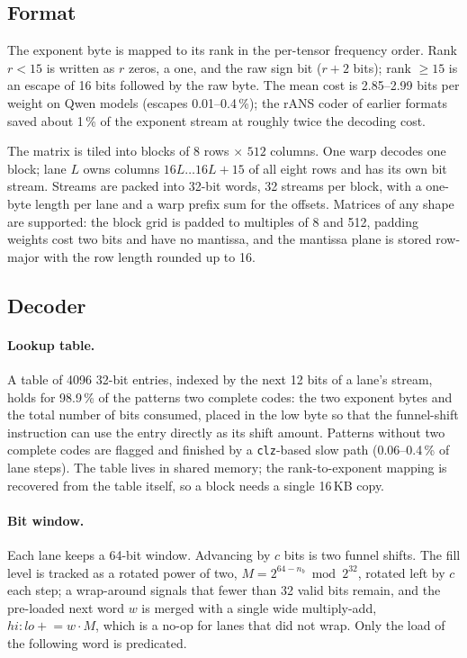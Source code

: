 \documentclass[11pt]{article}
\begin{document}
\subsection{Format}

The exponent byte is mapped to its rank in the per-tensor frequency order. Rank $r < 15$ is written as
$r$ zeros, a one, and the raw sign bit ($r+2$ bits); rank $\geq 15$ is an escape of 16 bits followed by
the raw byte. The mean cost is 2.85--2.99 bits per weight on Qwen models (escapes 0.01--0.4\,\%); the rANS
coder of earlier formats saved about 1\,\% of the exponent stream at roughly twice the decoding cost.

The matrix is tiled into blocks of $8$ rows $\times$ $512$ columns. One warp decodes one block; lane $L$
owns columns $16L \ldots 16L+15$ of all eight rows and has its own bit stream. Streams are packed into
32-bit words, 32 streams per block, with a one-byte length per lane and a warp prefix sum for the offsets.
Matrices of any shape are supported: the block grid is padded to multiples of 8 and 512, padding weights
cost two bits and have no mantissa, and the mantissa plane is stored row-major with the row length
rounded up to 16.

\subsection{Decoder}

\paragraph{Lookup table.} A table of 4096 32-bit entries, indexed by the next 12 bits of a lane's stream,
holds for 98.9\,\% of the patterns two complete codes: the two exponent bytes and the total number of bits
consumed, placed in the low byte so that the funnel-shift instruction can use the entry directly as its
shift amount. Patterns without two complete codes are flagged and finished by a \texttt{clz}-based slow
path (0.06--0.4\,\% of lane steps). The table lives in shared memory; the rank-to-exponent mapping is
recovered from the table itself, so a block needs a single 16\,KB copy.

\paragraph{Bit window.} Each lane keeps a 64-bit window. Advancing by $c$ bits is two funnel shifts. The
fill level is tracked as a rotated power of two, $M = 2^{64-n_b} \bmod 2^{32}$, rotated left by $c$ each
step; a wrap-around signals that fewer than 32 valid bits remain, and the pre-loaded next word $w$ is
merged with a single wide multiply-add, $\mathit{hi{:}lo} \mathrel{+}= w \cdot M$, which is a no-op for
lanes that did not wrap. Only the load of the following word is predicated.
\end{document}
